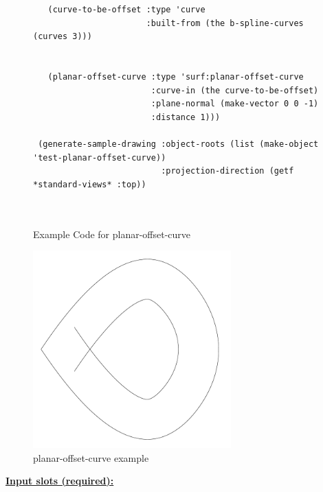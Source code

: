 \documentclass [11pt]{book}
\begin{document}
\begin{itemize}
\begin{figure}
\begin{lrbox}{\boxedverb}
\begin{minipage}{\linewidth}
{\begin{verbatim}
   (curve-to-be-offset :type 'curve
                       :built-from (the b-spline-curves (curves 3)))
   
   
   (planar-offset-curve :type 'surf:planar-offset-curve
                        :curve-in (the curve-to-be-offset)
                        :plane-normal (make-vector 0 0 -1)
                        :distance 1)))

 (generate-sample-drawing :object-roots (list (make-object 'test-planar-offset-curve))
                          :projection-direction (getf *standard-views* :top))

 
\end{verbatim}}
\end{minipage}
\end{lrbox}
\fbox{\usebox{\boxedverb}}

\caption{Example Code for planar-offset-curve}

\label{fig:example-code-planar-offset-curve}

\end{figure}

\begin{figure}
\begin{center}
\includegraphics[width=3in,height=3in]{../images/example-planar-offset-curve.pdf}
\end{center}

\caption{planar-offset-curve example}

\label{fig:planar-offset-curve}

\end{figure}





\textbf{
\underline{Input slots (required):}}

\begin{description}


\end{description}
\end{itemize}
\end{document}
